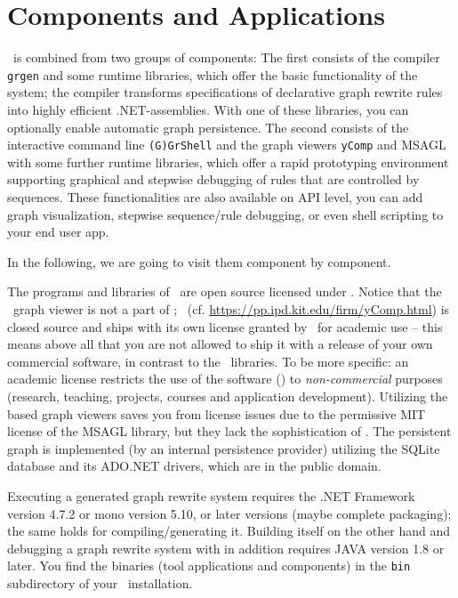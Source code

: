 \chapter{Components and Applications}
\label{cha:toolsandcomponents}

\GrG\ is combined from two groups of components:
The first consists of the compiler \texttt{grgen} and some runtime libraries, which offer the basic functionality of the system;
the compiler transforms specifications of declarative graph rewrite rules into highly efficient .NET-assemblies.
With one of these libraries, you can optionally enable automatic graph persistence.
The second consists of the interactive command line \texttt{(G)GrShell} and the graph viewers \texttt{yComp} and MSAGL with some further runtime libraries,
which offer a rapid prototyping environment supporting graphical and stepwise debugging of rules that are controlled by sequences.
These functionalities are also available on API level, you can add graph visualization, stepwise sequence/rule debugging, or even shell scripting to your end user app.

In the following, we are going to visit them component by component.



The programs and libraries of \GrG\ are open source licensed under \cite{LGPL3}.
Notice that the \yComp\ graph viewer is not a part of \GrG ; \yComp\ (cf. \url{https://pp.ipd.kit.edu/firm/yComp.html}) is closed source and ships with its own license granted by \yFiles\ for academic use --
this means above all that you are not allowed to ship it with a release of your own commercial software, in contrast to the \GrG\ libraries.
To be more specific: an academic license restricts the use of the software (\yComp) to \emph{non-commercial} purposes (research, teaching, projects, courses and application development).
Utilizing the \MSAGL{} based graph viewers saves you from license issues due to the permissive MIT license of the MSAGL library, but they lack the sophistication of \yComp{}.
The persistent graph is implemented (by an internal persistence provider) utilizing the SQLite database and its ADO.NET drivers, which are in the public domain.

Executing a generated graph rewrite system requires the .NET Framework\cite{NET} version 4.7.2 or mono\cite{MONO} version 5.10, or later versions (maybe complete packaging); the same holds for compiling/generating it.
Building \GrG{} itself on the other hand and debugging a graph rewrite system with \yComp{} in addition requires JAVA\cite{JAVAweb} version 1.8 or later. 
You find the binaries (tool applications and components) in the \texttt{bin} subdirectory of your \GrG\ installation.


